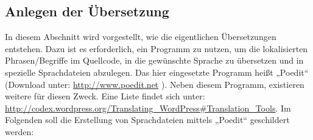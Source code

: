 \subsection{Anlegen der Übersetzung}\label{sub:adue}
In diesem Abschnitt wird vorgestellt, wie die eigentlichen Übersetzungen entstehen. Dazu ist es erforderlich, ein Programm zu nutzen, um die lokalisierten Phrasen/Begriffe im Quellcode, in die gewünschte Sprache zu übersetzen und in spezielle Sprachdateien abzulegen. Das hier eingesetzte Programm heißt „Poedit“ (Download unter: \url{http://www.poedit.net} ). Neben diesem Programm, existieren weitere für diesen Zweck. Eine Liste findet sich unter: \url{http://codex.wordpress.org/Translating\_WordPress\#Translation\_Tools}.
\newline
Im Folgenden soll die Erstellung von Sprachdateien mittels  „Poedit“ geschildert werden:
